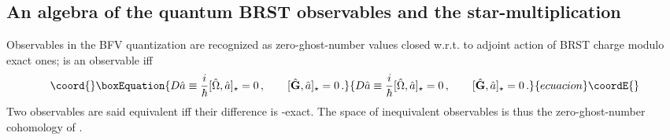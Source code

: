\documentclass[a4paper,11pt,oneside]{amsart}
\theoremstyle{plain}
\numberwithin{equation}{section} %
\numberwithin{figure}{section} %
\providecommand{\qcommut}[2]{[#1,#2]_\star}
\def\G{{ \bf G}}
\begin{document}
\subsection{An algebra of the quantum BRST observables
and the star-multiplication}
Observables in the BFV quantization are
recognized as zero-ghost-number values
closed w.r.t. to adjoint action \coordHE{} of
BRST charge \myHighlight{$\hat\Omega$}\coordHE{} modulo exact
ones; \coordHE{} is an observable iff
\begin{equation}\coord{}\boxEquation{
\label{eq:Observables-determin}
  D{\hat a} \equiv \frac{i}{\hbar}\qcommut{\hat\Omega}{\hat a}=0\,,
  \qquad
  \qcommut{\hat\G}{\hat a}=0\,.
}{
D{\hat a} \equiv \frac{i}{\hbar}\qcommut{\hat\Omega}{\hat a}=0\,,
  \qquad
  \qcommut{\hat\G}{\hat a}=0\,.
}{ecuacion}\coordE{}\end{equation}
Two observables are said equivalent iff their
difference is \coordHE{}-exact.  The space of inequivalent
observables is thus the zero-ghost-number cohomology of \coordHE{}.
\end{document}
